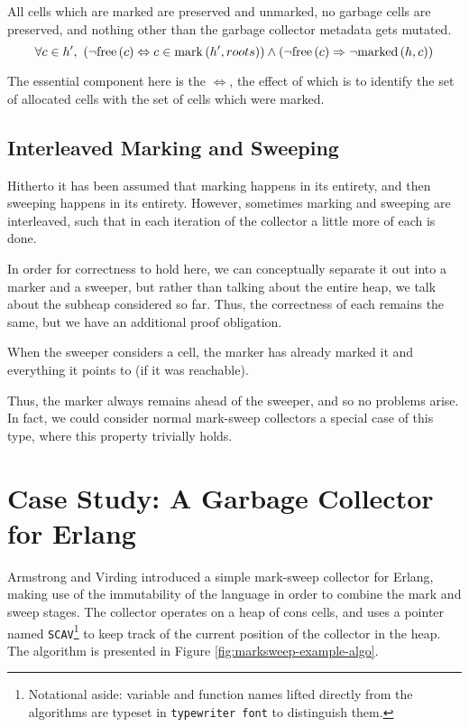 \begin{definition}
  \label{def:ms-correct-sweeping}
  All cells which are marked are preserved and unmarked, no garbage
  cells are preserved, and nothing other than the garbage collector
  metadata gets mutated.
  \[\forall c \in h',\ \left(\lnot\mathrm{free}\left(c\right) \Leftrightarrow c \in
    \mathrm{mark}\left(h', roots\right)\right) \land \left(\lnot\mathrm{free}\left(c\right) \Rightarrow
    \lnot\mathrm{marked}\left(h, c\right)\right)\]
\end{definition}

The essential component here is the $\iff$, the effect of which is to
identify the set of allocated cells with the set of cells which were
marked.

\subsection{Interleaved Marking and Sweeping}
\label{sec:marksweep-sweeping-interleaved}

Hitherto it has been assumed that marking happens in its entirety, and
then sweeping happens in its entirety. However, sometimes marking and
sweeping are interleaved, such that in each iteration of the collector
a little more of each is done.

In order for correctness to hold here, we can conceptually separate it
out into a marker and a sweeper, but rather than talking about the
entire heap, we talk about the subheap considered so far. Thus, the
correctness of each remains the same, but we have an additional proof
obligation.

\begin{definition}
  \label{def:ms-interleaved}
  When the sweeper considers a cell, the marker has already marked it
  and everything it points to (if it was reachable).
\end{definition}

Thus, the marker always remains ahead of the sweeper, and so no
problems arise. In fact, we could consider normal mark-sweep
collectors a special case of this type, where this property trivially
holds.

\section{Case Study: A Garbage Collector for Erlang}
\label{sec:marksweep-example}

Armstrong and Virding\cite{Armstrong95} introduced a simple mark-sweep
collector for Erlang, making use of the immutability of the language
in order to combine the mark and sweep stages. The collector operates
on a heap of cons cells, and uses a pointer named
\texttt{SCAV}\footnote{Notational aside: variable and function names
  lifted directly from the algorithms are typeset in
  \texttt{typewriter font} to distinguish them.} to keep track of the
current position of the collector in the heap. The algorithm is
presented in Figure \ref{fig:marksweep-example-algo}.

